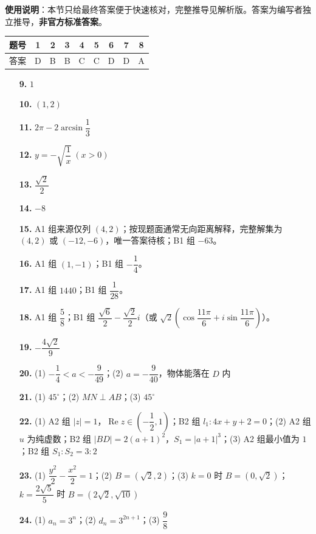 
\begin{gknotice}
\textbf{使用说明}：本节只给最终答案便于快速核对，完整推导见解析版。答案为编写者独立推导，\textbf{非官方标准答案}。
\end{gknotice}

\begin{center}\begin{tabular}{ccccccccc}
\toprule
题号 & 1 & 2 & 3 & 4 & 5 & 6 & 7 & 8 \\
\midrule
答案 & D & B & B & C & C & D & D & A \\
\bottomrule
\end{tabular}\end{center}

\begin{itemize}[leftmargin=2.6em]
  \item[\textbf{9.}] $1$
  \item[\textbf{10.}] $(1,2)$
  \item[\textbf{11.}] $2\pi-2\arcsin\dfrac13$
  \item[\textbf{12.}] $y=-\sqrt{\dfrac1x}\ (x>0)$
  \item[\textbf{13.}] $\dfrac{\sqrt2}{2}$
  \item[\textbf{14.}] $-8$
  \item[\textbf{15.}] A1 组来源仅列 $(4,2)$；按现题面通常无向距离解释，完整解集为 $(4,2)$ 或 $(-12,-6)$，唯一答案待核；B1 组 $-63$。
  \item[\textbf{16.}] A1 组 $(1,-1)$；B1 组 $-\dfrac14$。
  \item[\textbf{17.}] A1 组 $1440$；B1 组 $\dfrac1{28}$。
  \item[\textbf{18.}] A1 组 $\dfrac58$；B1 组 $\dfrac{\sqrt6}{2}-\dfrac{\sqrt2}{2}i$（或 $\sqrt2(\cos\dfrac{11\pi}{6}+i\sin\dfrac{11\pi}{6})$）。
\end{itemize}

\begin{itemize}[leftmargin=2.6em]
  \item[\textbf{19.}] $-\dfrac{4\sqrt2}{9}$
  \item[\textbf{20.}] (1) $-\dfrac14<a<-\dfrac9{49}$；(2) $a=-\dfrac9{40}$，物体能落在 $D$ 内
  \item[\textbf{21.}] (1) $45^\circ$；(2) $MN\perp AB$；(3) $45^\circ$
  \item[\textbf{22.}] (1) A2 组 $|z|=1$，$\operatorname{Re}z\in\left(-\dfrac12,1\right)$；B2 组 $l_1:4x+y+2=0$；(2) A2 组 $u$ 为纯虚数；B2 组 $|BD|=2(a+1)^2$，$S_1=|a+1|^3$；(3) A2 组最小值为 $1$；B2 组 $S_1:S_2=3:2$
  \item[\textbf{23.}] (1) $\dfrac{y^2}{2}-\dfrac{x^2}{2}=1$；(2) $B=(\sqrt2,2)$；(3) $k=0$ 时 $B=(0,\sqrt2)$；$k=\dfrac{2\sqrt5}{5}$ 时 $B=(2\sqrt2,\sqrt{10})$
  \item[\textbf{24.}] (1) $a_n=3^n$；(2) $d_n=3^{2n+1}$；(3) $\dfrac98$
\end{itemize}
